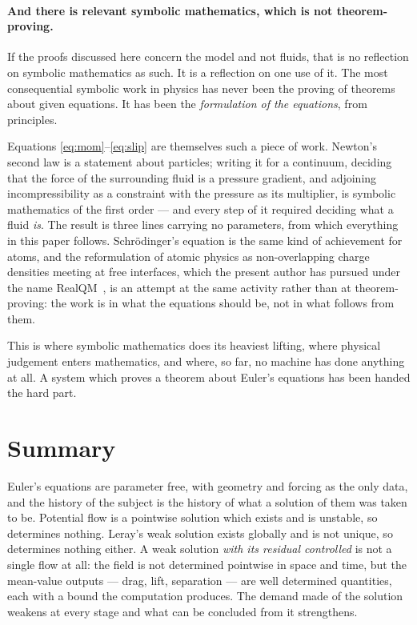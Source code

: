 \documentclass[11pt]{article}
\begin{document}
\paragraph{And there is relevant symbolic mathematics, which is not theorem-proving.} If the proofs
discussed here concern the model and not fluids, that is no reflection on symbolic mathematics as
such. It is a reflection on one use of it. The most consequential symbolic work in physics has never
been the proving of theorems about given equations. It has been the \emph{formulation of the
equations}, from principles.

Equations \eqref{eq:mom}--\eqref{eq:slip} are themselves such a piece of work. Newton's second law is
a statement about particles; writing it for a continuum, deciding that the force of the surrounding
fluid is a pressure gradient, and adjoining incompressibility as a constraint with the pressure as
its multiplier, is symbolic mathematics of the first order --- and every step of it required deciding
what a fluid \emph{is}. The result is three lines carrying no parameters, from which everything in
this paper follows. Schr\"odinger's equation is the same kind of achievement for atoms, and the
reformulation of atomic physics as non-overlapping charge densities meeting at free interfaces, which
the present author has pursued under the name RealQM~\cite{realqm}, is an attempt at the same activity rather
than at theorem-proving: the work is in what the equations should be, not in what follows from them.

This is where symbolic mathematics does its heaviest lifting, where physical judgement enters
mathematics, and where, so far, no machine has done anything at all. A system which proves a theorem
about Euler's equations has been handed the hard part.

\section{Summary}\label{sec:summary}

Euler's equations are parameter free, with geometry and forcing as the only data, and the history of
the subject is the history of what a solution of them was taken to be. Potential flow is a pointwise
solution which exists and is unstable, so determines nothing. Leray's weak solution exists globally
and is not unique, so determines nothing either. A weak solution \emph{with its residual controlled}
is not a single flow at all: the field is not determined pointwise in space and time, but the
mean-value outputs --- drag, lift, separation --- are well determined quantities, each with a bound
the computation produces. The demand made of the solution weakens at every stage
and what can be concluded from it strengthens.
\end{document}
